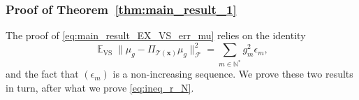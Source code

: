 \documentclass[twoside,11pt]{book}
\DeclareMathOperator{\VS}{\mathrm{VS}}
\DeclareMathOperator{\Tran}{\intercal}
\DeclareMathOperator{\EX}{\mathbb{E}}
\DeclareMathOperator{\F}{\mathcal{F}}
\DeclareMathOperator{\Ns}{\mathbb{N}^{*}}
\begin{document}

\subsubsection{Proof of Theorem~\ref{thm:main_result_1}}\label{app:proof_main_result_1}
The proof of \eqref{eq:main_result_EX_VS_err_mu} relies on the identity
\begin{equation}\label{eq:main_result_EX_VS_err_mu_2}
\EX_{\VS} \|\mu_{g} - \Pi_{\mathcal{T}(\bm{x})} \mu_{g}\|_{\F}^{2} = \sum\limits_{m \in \mathbb{N}^{*}} g_{m}^{2} \epsilon_{m},
\end{equation}
and the fact that $(\epsilon_{m})$ is a non-increasing sequence. We prove these two results in turn, after what we prove \eqref{eq:ineq_r_N}.
\end{document}
